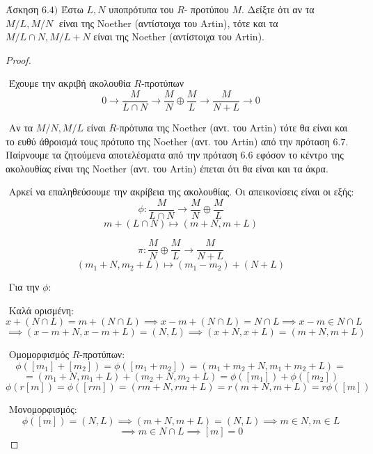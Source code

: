 \documentclass[oneside,a4paper]{article}
\newcommand {\tl}{\textlatin}
\begin{document}
\noindent Άσκηση $6.4)$
\quad Έστω $L,N$ υποπρότυπα του $R$- προτύπου $M.$ Δείξτε ότι αν τα ${M}/{L}, {M}/{N}\;$  είναι της \tl{Noether} (αντίστοιχα του \tl{Artin}), τότε και τα ${M}/{L\cap N} , {M}/{L+N}$ είναι της \tl{Noether} (αντίστοιχα του \tl{Artin}).
\vspace*{1cm}
\begin{proof} $ $

	$ $\newline
	Έχουμε την ακριβή ακολουθία $R$-προτύπων 
	$$0 \longrightarrow \frac{M}{L\cap N} \longrightarrow \frac MN \oplus \frac ML \longrightarrow \frac{M}{N+L} \longrightarrow 0$$ 

	$ $\newline
	Αν τα $M/N, M/L$ είναι $R$-πρότυπα της \tl{Noether} (αντ. του \tl{Artin}) τότε θα είναι και το ευθύ άθροισμά τους πρότυπο της \tl{Noether} (αντ. του \tl{Artin}) από την πρόταση $6.7$. Παίρνουμε τα ζητούμενα αποτελέσματα από την πρόταση $6.6$ εφόσον το κέντρο της ακολουθίας είναι της \tl{Noether} (αντ. του \tl{Artin}) έπεται ότι θα είναι και τα άκρα.

	$ $\newline
	Αρκεί να επαληθεύσουμε την ακρίβεια της ακολουθίας. Οι απεικονίσεις είναι οι εξής:
	$$\phi: \frac{M}{L\cap N} \longrightarrow \frac MN \oplus \frac ML$$ 
	$$m + (L\cap N) \longmapsto (m + N, m + L)$$

	\vspace*{0.1cm}
	$$ \pi: \frac MN \oplus \frac ML \longrightarrow \frac{M}{N+L}$$ 
	$$(m_1 + N, m_2 + L) \longmapsto (m_1 - m_2) + (N+L)$$

	$ $\newline
	Για την $\phi$:
	
	$ $\newline
	Καλά ορισμένη:
	$$x+(N\cap L) = m + (N\cap L) \implies x-m + (N\cap L) = N\cap L \implies x-m \in N\cap L$$
	$$ \implies (x-m +N , x-m +L) =  (N, L) \implies (x+N,x+L) = (m+N,m+L)$$

	$ $\newline
	Ομομορφισμός $R$-προτύπων:
	$$\phi( [m_1] + [m_2]) = \phi( [m_1 + m_2]) = (m_1 + m_2 + N, m_1 + m_2 + L) = $$
	$$=  (m_1 + N, m_1 + L) + (m_2 + N, m_2 + L) =  \phi([m_1]) + \phi([m_2])$$
	\vspace*{0.1cm}
	$$\phi(r[m]) = \phi([rm]) = (rm + N, rm+L) = r(m+N,m+L) = r\phi([m])$$

	$ $\newline
	Μονομορφισμός:
	$$\phi([m]) = (N,L) \implies (m+N,m+L) = (N,L) \implies m\in N , m \in L $$
	$$\implies m\in N\cap L \implies [m]=0$$


\end{proof}
\end{document}
